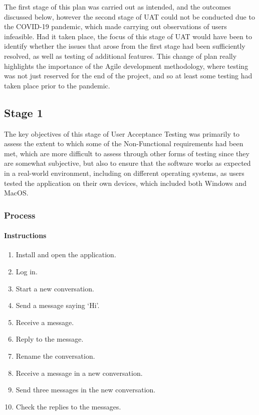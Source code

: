 The first stage of this plan was carried out as intended, and the outcomes discussed below, however the second stage of UAT could not be conducted due to the COVID-19 pandemic, which made carrying out observations of users infeasible. Had it taken place, the focus of this stage of UAT would have been to identify whether the issues that arose from the first stage had been sufficiently resolved, as well as testing of additional features. This change of plan really highlights the importance of the Agile development methodology, where testing was not just reserved for the end of the project, and so at least some testing had taken place prior to the pandemic.

\subsection{Stage 1}\label{sec:stage1-uat}
The key objectives of this stage of User Acceptance Testing was primarily to assess the extent to which some of the Non-Functional requirements had been met, which are more difficult to assess through other forms of testing since they are somewhat subjective, but also to ensure that the software works as expected in a real-world environment, including on different operating systems, as users tested the application on their own devices, which included both Windows and MacOS.

\subsubsection{Process}

\paragraph{Instructions}
\begin{enumerate}
  \item Install and open the application.
  \item Log in.
  \item Start a new conversation.
  \item Send a message saying `Hi'.
  \item Receive a message.
  \item Reply to the message.
  \item Rename the conversation. 
  \item Receive a message in a new conversation.
  \item Send three messages in the new conversation.
  \item Check the replies to the messages.
\end{enumerate}


